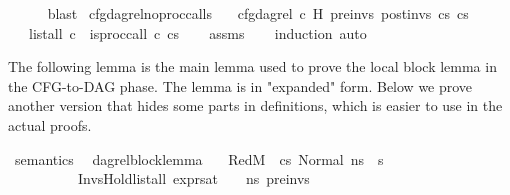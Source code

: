 \begin{isabellebody}
\ \ \ \ \isamarkupfalse%
\ blast\isanewline
{}\isamarkupfalse%
%
\endisatagproof
{\isafoldproof}%
%
\isadelimproof
\isanewline
%
\endisadelimproof
\isanewline
{}\isamarkupfalse%
\isanewline
\isanewline
\isanewline
{}\isamarkupfalse%
\ cfg{\isacharunderscore}{\kern0pt}dag{\isacharunderscore}{\kern0pt}rel{\isacharunderscore}{\kern0pt}no{\isacharunderscore}{\kern0pt}proc{\isacharunderscore}{\kern0pt}calls{\isacharcolon}{\kern0pt}\isanewline
\ \ \ {\isachardoublequoteopen}cfg{\isacharunderscore}{\kern0pt}dag{\isacharunderscore}{\kern0pt}rel\ c\ H\ pre{\isacharunderscore}{\kern0pt}invs\ post{\isacharunderscore}{\kern0pt}invs\ cs{}\ cs{}{\isachardoublequoteclose}\isanewline
\ \ \ {\isachardoublequoteopen}list{\isacharunderscore}{\kern0pt}all\ {\isacharparenleft}{\kern0pt}{\isasymlambda}c{\isachardot}{\kern0pt}\ {\isasymnot}\ is{\isacharunderscore}{\kern0pt}proc{\isacharunderscore}{\kern0pt}call\ c{\isacharparenright}{\kern0pt}\ cs{}{\isachardoublequoteclose}\isanewline
%
\isadelimproof
\ \ %
\endisadelimproof
%
\isatagproof
{}\isamarkupfalse%
\ assms\isanewline
\ \ \isamarkupfalse%
\ {\isacharparenleft}{\kern0pt}induction{\isacharparenright}{\kern0pt}\ auto%
\endisatagproof
{\isafoldproof}%
%
\isadelimproof
%
\endisadelimproof
%
\begin{isamarkuptext}%
The following lemma is the main lemma used to prove the local block lemma in the CFG-to-DAG 
phase. The lemma is in "expanded" form. Below we prove another version that hides some parts in 
definitions, which is easier to use in the actual proofs.%
\end{isamarkuptext}\isamarkuptrue%
\isamarkupfalse%
\ semantics\ \isanewline
\isanewline
{}\isamarkupfalse%
\ dag{\isacharunderscore}{\kern0pt}rel{\isacharunderscore}{\kern0pt}block{\isacharunderscore}{\kern0pt}lemma{\isacharcolon}{\kern0pt}\isanewline
\ \ \ Red{\isacharcolon}{\kern0pt}{\isachardoublequoteopen}M{\isacharcomma}{\kern0pt}{\isasymLambda}{\isacharcomma}{\kern0pt}{\isasymGamma}{\isacharcomma}{\kern0pt}{\isasymOmega}\ {\isasymturnstile}\ {\isasymlangle}cs{}{\isacharcomma}{\kern0pt}\ Normal\ ns{}{\isasymrangle}\ {\isacharbrackleft}{\kern0pt}{\isasymrightarrow}{\isacharbrackright}{\kern0pt}\ s{\isacharprime}{\kern0pt}{\isachardoublequoteclose}\ \isanewline
\ \ \ \ \ \ \ \ \ \ InvsHold{\isacharcolon}{\kern0pt}{\isachardoublequoteopen}list{\isacharunderscore}{\kern0pt}all\ {\isacharparenleft}{\kern0pt}expr{\isacharunderscore}{\kern0pt}sat\ {\isasymLambda}\ {\isasymGamma}\ {\isasymOmega}\ ns{}{\isacharparenright}{\kern0pt}\ pre{\isacharunderscore}{\kern0pt}invs{\isachardoublequoteclose}\ \isanewline

\end{isabellebody}
